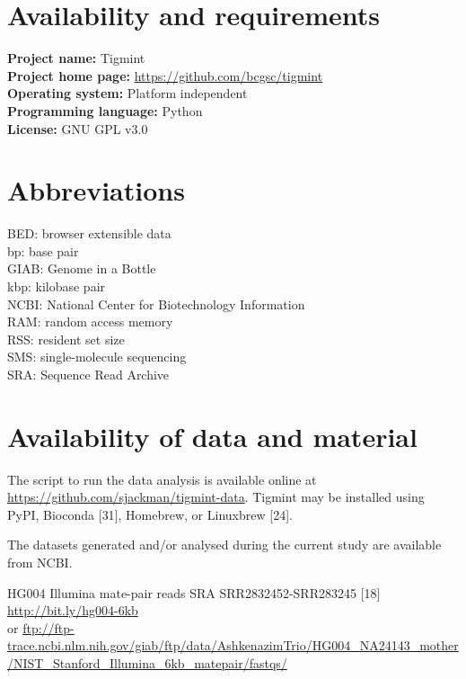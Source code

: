 \documentclass{bmcart}
\begin{document}
\begin{backmatter}

\hypertarget{availability-and-requirements}{%
\section*{Availability and requirements}\label{availability-and-requirements}}

\textbf{Project name:} Tigmint\\
\textbf{Project home page:} \url{https://github.com/bcgsc/tigmint}\\
\textbf{Operating system:} Platform independent\\
\textbf{Programming language:} Python\\
\textbf{License:} GNU GPL v3.0

\hypertarget{abbreviations}{%
\section*{Abbreviations}\label{abbreviations}}

BED: browser extensible data\\
bp: base pair\\
GIAB: Genome in a Bottle\\
kbp: kilobase pair\\
NCBI: National Center for Biotechnology Information\\
RAM: random access memory\\
RSS: resident set size\\
SMS: single-molecule sequencing\\
SRA: Sequence Read Archive

\hypertarget{availability-of-data-and-material}{%
\section*{Availability of data and material}\label{availability-of-data-and-material}}

The script to run the data analysis is available online at \url{https://github.com/sjackman/tigmint-data}. Tigmint may be installed using PyPI, Bioconda {[}31{]}, Homebrew, or Linuxbrew {[}24{]}.

The datasets generated and/or analysed during the current study are available from NCBI.

HG004 Illumina mate-pair reads SRA SRR2832452-SRR283245 {[}18{]} \url{http://bit.ly/hg004-6kb}\\
or \url{ftp://ftp-trace.ncbi.nlm.nih.gov/giab/ftp/data/AshkenazimTrio/HG004_NA24143_mother/NIST_Stanford_Illumina_6kb_matepair/fastqs/}


\end{backmatter}
\end{document}
